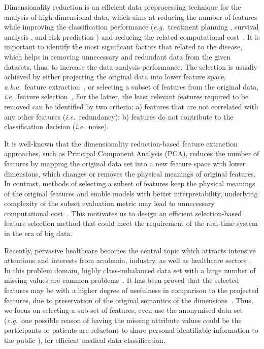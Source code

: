 \documentclass{article}
\newcommand{\zzie}{\emph{i.e.}~}
\newcommand{\zzeg}{\emph{e.g.}~}
\newcommand{\zzaka}{\emph{a.k.a.}~}
\newcommand*{\1}{\textcolor{red}}
\begin{document}
Dimensionality reduction is an efficient data preprocessing technique for the analysis of high dimensional data, which aims at reducing the number of features while improving the classification performance (\zzeg treatment planning \cite{duanmu2020prediction}, survival analysis \cite{rietschel2018feature}, and risk prediction \cite{denaxas2018prediction}) and reducing the related computational cost~\cite{8361067}. It is important to identify the most significant factors that related to the disease, which helps in removing unnecessary and redundant data from the given datasets, thus, to increase the data analysis performance. The selection is usually achieved by either projecting the original data into lower feature space, \zzaka feature extraction~\cite{han2018unified}, or selecting a subset of features from the original data, \zzie feature selection~\cite{liu2014feature}. For the latter, the least relevant features required to be removed can be identified by two criteria: a) features that are not correlated with any other features (\zzie redundancy); b) features do not contribute to the classification decision (\zzie noise).



It is well-known that the dimensionality reduction-based feature extraction approaches, such as Principal Component Analysis (PCA), reduces the number of features by mapping the original data set into a new feature space with lower dimensions, which changes or removes the physical meanings of original features. In contrast, methods of selecting a subset of features keep the physical meanings of the original features and enable models with better interpretability, underlying complexity of the subset evaluation metric may lead to unnecessary computational cost~\cite{JENSEN20151}. This motivates us to design an efficient selection-based feature selection method that could meet the requirement of the real-time system in the era of big data. 

Recently, pervasive healthcare becomes the central topic which attracts intensive attentions and interests from academia, industry, as well as healthcare sectors~\cite{li2019bayesian,lu2020machine,livieris2019improving,tang2019construction,aydin2019construction,yang2018new,elyan2017genetic,apicella2019simple}. In this problem domain, highly class-imbalanced data set with a large number of missing values are common problems~\cite{CervicalCancerDS2017}. It has been proved that the selected features may be with a higher degree of usefulness in comparison to the projected features, due to preservation of the original semantics of the dimensions~\cite{8361067,liu2014feature}. Thus, we focus on selecting a sub-set of features, even use the anonymised data set (\zzeg one possible reason of having the missing attribute values could be the participants or patients are reluctant to share personal identifiable information to the public \cite{CervicalCancerDS2017}), for efficient medical data classification.
\end{document}
